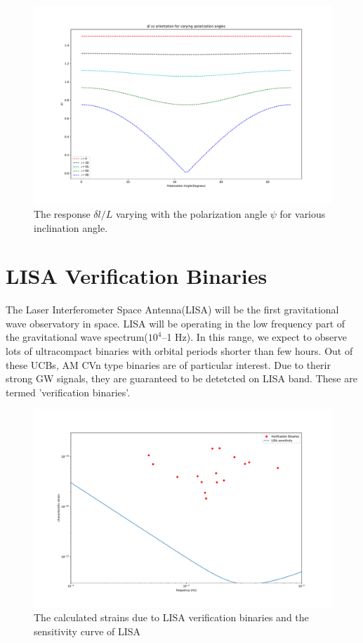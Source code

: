 \documentclass[10pt,a4paper]{article}
\begin{document}
\begin{figure}[!h]
\centering
\includegraphics[scale=0.3]{../Figures/responsevsorientationofbinary.pdf}
\caption{The response $\delta l/L$ varying with the polarization
  angle $\psi$ for various inclination angle.\label{fig:resporient}}
\end{figure}

\newpage
\section*{LISA Verification Binaries}
The Laser Interferometer Space Antenna(LISA) will be the first gravitational wave observatory in space. LISA will be operating in the low frequency part of the gravitational wave spectrum($10^4$--1 Hz). In this range, we expect to observe lots of ultracompact binaries with orbital periods shorter than few hours. Out of these UCBs, AM CVn type binaries are of particular interest. Due to therir strong GW signals, they are guaranteed to be  detetcted on LISA band. These are termed 'verification binaries'.


\begin{figure}[ht]
\centering
\includegraphics[scale=0.25]{../Figures/strain_verific_binary.pdf}
\caption{The calculated strains due to LISA verification binaries and the sensitivity curve of LISA}
\end{figure}
\end{document}

